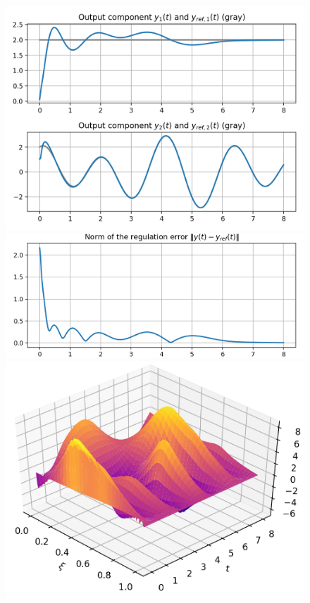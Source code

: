 \documentclass[11pt, a4paper]{amsart}
\theoremstyle{definition}
\numberwithin{equation}{section}
\begin{document}
\begin{figure}[h!]
  \begin{minipage}{0.48\linewidth}
    \includegraphics[width=\linewidth]{H1d3out.png}

    \vspace{2ex}

    \includegraphics[width=\linewidth]{H1d3err.png}
  \end{minipage}
  \hfill
  \begin{minipage}{0.48\linewidth}
    \includegraphics[width=.95\linewidth]{H1d3surf.png}


\end{minipage}
\end{figure}
\end{document}
